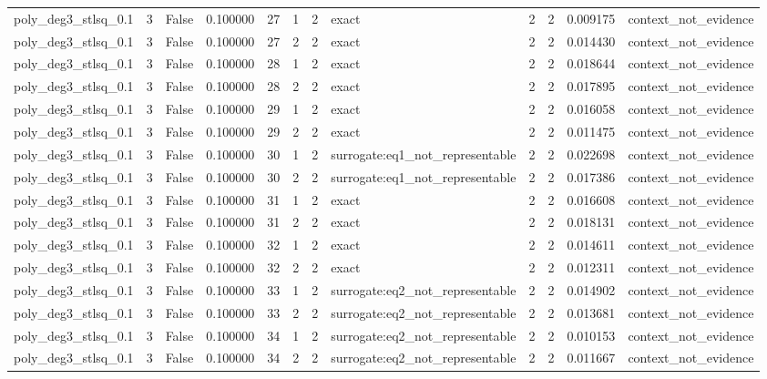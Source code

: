 \begin{tabular}{lrrrrrrlrrrl}
poly\_deg3\_stlsq\_0.1 & 3 & False & 0.100000 & 27 & 1 & 2 & exact & 2 & 2 & 0.009175 & context\_not\_evidence \\
poly\_deg3\_stlsq\_0.1 & 3 & False & 0.100000 & 27 & 2 & 2 & exact & 2 & 2 & 0.014430 & context\_not\_evidence \\
poly\_deg3\_stlsq\_0.1 & 3 & False & 0.100000 & 28 & 1 & 2 & exact & 2 & 2 & 0.018644 & context\_not\_evidence \\
poly\_deg3\_stlsq\_0.1 & 3 & False & 0.100000 & 28 & 2 & 2 & exact & 2 & 2 & 0.017895 & context\_not\_evidence \\
poly\_deg3\_stlsq\_0.1 & 3 & False & 0.100000 & 29 & 1 & 2 & exact & 2 & 2 & 0.016058 & context\_not\_evidence \\
poly\_deg3\_stlsq\_0.1 & 3 & False & 0.100000 & 29 & 2 & 2 & exact & 2 & 2 & 0.011475 & context\_not\_evidence \\
poly\_deg3\_stlsq\_0.1 & 3 & False & 0.100000 & 30 & 1 & 2 & surrogate:eq1\_not\_representable & 2 & 2 & 0.022698 & context\_not\_evidence \\
poly\_deg3\_stlsq\_0.1 & 3 & False & 0.100000 & 30 & 2 & 2 & surrogate:eq1\_not\_representable & 2 & 2 & 0.017386 & context\_not\_evidence \\
poly\_deg3\_stlsq\_0.1 & 3 & False & 0.100000 & 31 & 1 & 2 & exact & 2 & 2 & 0.016608 & context\_not\_evidence \\
poly\_deg3\_stlsq\_0.1 & 3 & False & 0.100000 & 31 & 2 & 2 & exact & 2 & 2 & 0.018131 & context\_not\_evidence \\
poly\_deg3\_stlsq\_0.1 & 3 & False & 0.100000 & 32 & 1 & 2 & exact & 2 & 2 & 0.014611 & context\_not\_evidence \\
poly\_deg3\_stlsq\_0.1 & 3 & False & 0.100000 & 32 & 2 & 2 & exact & 2 & 2 & 0.012311 & context\_not\_evidence \\
poly\_deg3\_stlsq\_0.1 & 3 & False & 0.100000 & 33 & 1 & 2 & surrogate:eq2\_not\_representable & 2 & 2 & 0.014902 & context\_not\_evidence \\
poly\_deg3\_stlsq\_0.1 & 3 & False & 0.100000 & 33 & 2 & 2 & surrogate:eq2\_not\_representable & 2 & 2 & 0.013681 & context\_not\_evidence \\
poly\_deg3\_stlsq\_0.1 & 3 & False & 0.100000 & 34 & 1 & 2 & surrogate:eq2\_not\_representable & 2 & 2 & 0.010153 & context\_not\_evidence \\
poly\_deg3\_stlsq\_0.1 & 3 & False & 0.100000 & 34 & 2 & 2 & surrogate:eq2\_not\_representable & 2 & 2 & 0.011667 & context\_not\_evidence \\

\end{tabular}
